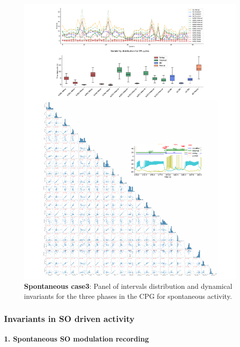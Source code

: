 \begin{figure}[htbp]
	\centering
	\includegraphics[width=1.1\textwidth]{./invariants/data/SUSSEX/prep3/images/3phases/panel_with_pairplot.pdf}
	\caption{\textbf{Spontaneous case3}: Panel of intervals distribution and dynamical invariants for the three phases in the CPG for spontaneous activity.}
	\label{fig:prep3 invariants pairplot}
\end{figure}


\subsubsection{Invariants in SO driven activity}
\paragraph{1. Spontaneous SO modulation recording}
 
